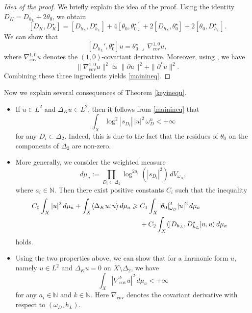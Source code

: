 \documentclass[english]{amsart}
\renewcommand{\geq}{\geqslant}
\newcommand{\dbar}{\bar \partial}
\numberwithin{equation}{thm}
\begin{document}
\begin{proof}[Idea of the proof]
	We briefly explain the idea of the proof.
	Using the identity $D_K = D_{h_L} + 2\theta_0$, we obtain
	\begin{equation}\label{form40}
		[D_K, D_K^\star]
		= [D_{h_L}, D_{h_L}^\star]
		+ 4[\theta_0, \theta^\star_0]
		+ 2[D_{h_L}, \theta^\star _0]
		+ 2[\theta_0, D_{h_L}^\star].
	\end{equation}
	We can show that
	\[
	[D_{h_L}', \theta^\star _0] u
	= \theta^\star_0 \,\lrcorner\, \nabla^{1,0}_{\mathrm{cov}} u,
	\]
	where $\nabla^{1,0}_{\mathrm{cov}} u$ denotes the $(1,0)$-covariant derivative.
	Moreover, using \cite{Siu82}, we have
	\[
	\|\nabla^{1,0}_{\mathrm{cov}} u\|^2
	\simeq
	\|\dbar u\|^2 + \|\dbar^\star u\|^2.
	\]
	Combining these three ingredients yields \eqref{mainineq}.
\end{proof}


Now we explain several consequences of Theorem \ref{keyinequ}.

\begin{itemize}
	\item If $u \in L^2$ and $\Delta_K u \in L^2$, then it follows from \eqref{mainineq} that
	\[
	\int_X \log^2 |s_{D_i}| \, |u|^2 \, \omega_D^n < +\infty
	\]
	for any $D_i \subset \Delta_2$. Indeed, this is due to the fact that the residues of $\theta_0$ on 
	the components of $\Delta_2$ are non-zero. 
	
	\item More generally, we consider the weighted measure
	\[
	d\mu_a := \prod_{D_i \subset \Delta_2} \log^{2a_i}(|s_{D_i}|^2)\, dV_{\omega_D},
	\]
	where $a_i \in \mathbb N$.
	Then there exist positive constants $C_i$ such that the inequality
	\begin{align}
		C_0 \int_X |u|^2 \, d\mu_a
		+ \int_X \langle \Delta_K u, u \rangle \, d\mu_a
		\geq {} &
		C_1 \int_X |\theta_0|_{\omega_D}^2 |u|^2 \, d\mu_a  \cr
		& {} + C_2 \int_X \langle [D_{h_L}, D^\star_{h_L}] u, u \rangle \, d\mu_a
		\nonumber
	\end{align}
	holds.
	
	\item Using the two properties above, we can show that for a harmonic form $u$, namely $u \in L^2$ and $\Delta_K u = 0$ on $X \setminus \Delta_2$, we have
	\begin{equation}\label{devrgood}
		\int_X |\nabla^k_{\mathrm{cov}} u|^2 \, d\mu_a < +\infty
	\end{equation}
	for any $a_i \in \mathbb N$ and $k \in \mathbb N$.
	Here $\nabla_{\mathrm{cov}}$ denotes the covariant derivative with respect to $(\omega_D, h_L)$.
\end{itemize}
\end{document}
